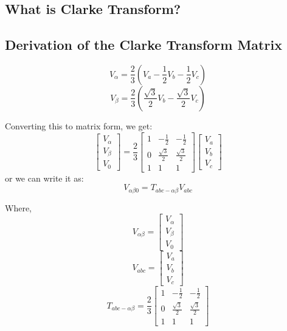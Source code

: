 \subsection{What is Clarke Transform?}
\subsection{Derivation of the Clarke Transform Matrix}
\begin{equation}
    V_\alpha = \frac{2}{3}(V_a - \frac{1}{2} V_b - \frac{1}{2} V_c)
\end{equation}
\begin{equation}
    V_\beta = \frac{2}{3}(\frac{\sqrt{3}}{2} V_b - \frac{\sqrt{3}}{2} V_c)
\end{equation}

\noindent
Converting this to matrix form, we get:
\begin{equation}
    \begin{bmatrix}
        V_\alpha \\
        V_\beta  \\
        V_0
    \end{bmatrix}
    =\frac{2}{3}
    \begin{bmatrix}
        1 & -\frac{1}{2}       & -\frac{1}{2}       \\
        0 & \frac{\sqrt{3}}{2} & \frac{\sqrt{3}}{2} \\
        1 & 1                  & 1
    \end{bmatrix}
    \begin{bmatrix}
        V_a \\
        V_b \\
        V_c
    \end{bmatrix}
\end{equation}
or we can write it as:
\begin{equation}
    V_{\alpha\beta0} = T_{abc-\alpha\beta} V_{abc}
\end{equation}

\noindent
Where,
\begin{equation*}
    V_{\alpha\beta} = \begin{bmatrix}
        V_\alpha \\
        V_\beta  \\
        V_0
    \end{bmatrix}
\end{equation*}
\begin{equation*}
    V_{abc} = \begin{bmatrix}
        V_a \\
        V_b \\
        V_c
    \end{bmatrix}
\end{equation*}
\begin{equation*}
    T_{abc-\alpha\beta} = \frac{2}{3}
    \begin{bmatrix}
        1 & -\frac{1}{2}       & -\frac{1}{2}       \\
        0 & \frac{\sqrt{3}}{2} & \frac{\sqrt{3}}{2} \\
        1 & 1                  & 1
    \end{bmatrix}
\end{equation*}


